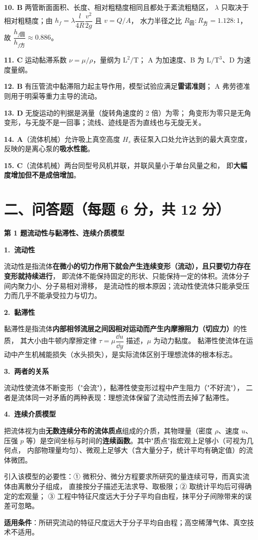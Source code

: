 \noindent\textbf{10. B\quad} 两管断面面积、长度、相对粗糙度相同且都处于紊流粗糙区，
$\lambda$ 只取决于相对粗糙度；由 $h_f=\lambda\dfrac{l}{4R}\dfrac{v^2}{2g}$ 且 $v=Q/A$，
水力半径之比 $R_{\text{圆}}:R_{\text{方}}=1.128:1$，
故 $\dfrac{h_{f\text{圆}}}{h_{f\text{方}}}\approx0.886$。

\noindent\textbf{11. C\quad} 运动黏滞系数 $\nu=\mu/\rho$，量纲为 $\mathrm{L^2/T}$；
A 为加速度、B 为 $\mathrm{L/T^3}$、D 为速度量纲。

\noindent\textbf{12. B\quad} 有压管流中黏滞阻力起主导作用，模型试验应满足\textbf{雷诺准则}；
A 弗劳德准则用于明渠等重力主导的流动。

\noindent\textbf{13. D\quad} 无旋运动的判据是涡量（旋转角速度的 2 倍）为零；
角变形为零只是无角变形，与无旋不是一回事；流线、迹线是否为直线也与无旋无关。

\noindent\textbf{14. A\quad}（流体机械）允许吸上真空高度 $H_s$ 表征泵入口处允许达到的最大真空度，
反映的是离心泵的\textbf{吸水性能}。

\noindent\textbf{15. C\quad}（流体机械）两台同型号风机并联，并联风量小于单台风量之和，
即\textbf{大幅度增加但不是成倍增加}。

\section*{二、问答题（每题 6 分，共 12 分）}

\noindent\textbf{第 1 题\quad 流动性与黏滞性、连续介质模型}

\begin{jie}
\textbf{1.\ 流动性}

流动性是指流体\textbf{在微小的切力作用下就会产生连续变形（流动），且只要切力存在变形就持续进行}，
即流体不能保持固定的形状、只能保持一定的体积。流体分子间内聚力小、分子易相对滑移，
是流动性的根本原因；流动性使流体只能承受压力而几乎不能承受拉力与切力。

\textbf{2.\ 黏滞性}

黏滞性是指流体\textbf{内部相邻流层之间因相对运动而产生内摩擦阻力（切应力）}的性质，
其大小由牛顿内摩擦定律 $\tau=\mu\dfrac{\dd u}{\dd y}$ 描述，$\mu$ 为动力黏度。
黏滞性使流体在运动中产生机械能损失（水头损失），是实际流体区别于理想流体的根本标志。

\textbf{3.\ 两者的关系}

流动性使流体不断变形（"会流"），黏滞性使变形过程中产生阻力（"不好流"），
二者是流体同一对矛盾的两种表现：理想流体保留了流动性而去掉了黏滞性。

\textbf{4.\ 连续介质模型}

把流体视为由\textbf{无数连续分布的流体质点}组成的介质，其物理量（密度 $\rho$、速度 $u$、
压强 $p$ 等）是空间坐标与时间的\textbf{连续函数}。其中"质点"指宏观上足够小（可视为几何点，
内部物理量均匀）、微观上足够大（含大量分子，统计平均有确定值）的流体微团。

引入该模型的必要性：① 微积分、微分方程要求所研究的量连续可导，而真实流体由离散分子组成，
直接按分子描述无法求导、取极限；② 取统计平均后可得确定的宏观量；
③ 工程中特征尺度远大于分子平均自由程，抹平分子间隙带来的误差可忽略。

\textbf{适用条件}：所研究流动的特征尺度远大于分子平均自由程；高空稀薄气体、真空技术不适用。
\end{jie}

